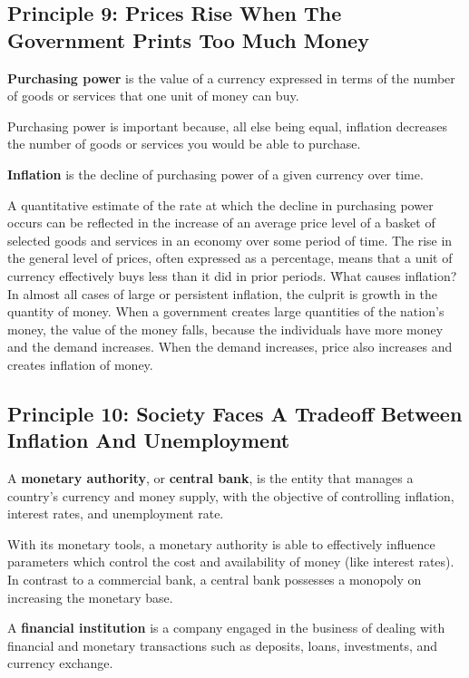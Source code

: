 \subsection*{Principle 9: Prices Rise When The Government Prints Too Much Money}

\textbf{Purchasing power} is the value of a currency expressed in terms of the number of goods or services that one unit
of money can buy.
\ed

Purchasing power is important because, all else being equal, inflation decreases the number of goods or services you
would be able to purchase.

\bd[Inflation]
\textbf{Inflation} is the decline of purchasing power of a given currency over time.
\ed

A quantitative estimate of the rate at which the decline in purchasing power occurs can be reflected in the increase
of an average price level of a basket of selected goods and services in an economy over some period of time. The rise
in the general level of prices, often expressed as a percentage, means that a unit of currency effectively buys less
than it did in prior periods. \v

What causes inflation? In almost all cases of large or persistent inflation, the culprit is growth in the quantity of
money. When a government creates large quantities of the nation's money, the value of the money falls, because the
individuals have more money and the demand increases. When the demand increases, price also increases and creates
inflation of money.

\subsection*{Principle 10: Society Faces A Tradeoff Between Inflation And Unemployment}

A \textbf{monetary authority}, or \textbf{central bank}, is the entity that manages a country's currency and money
supply, with the objective of controlling inflation, interest rates, and unemployment rate.
\ed

With its monetary tools, a monetary authority is able to effectively influence parameters which control the cost and
availability of money (like interest rates). In contrast to a commercial bank, a central bank possesses a monopoly on
increasing the monetary base.

A \textbf{financial institution} is a company engaged in the business of dealing with financial and monetary
transactions such as deposits, loans, investments, and currency exchange.
\ed

